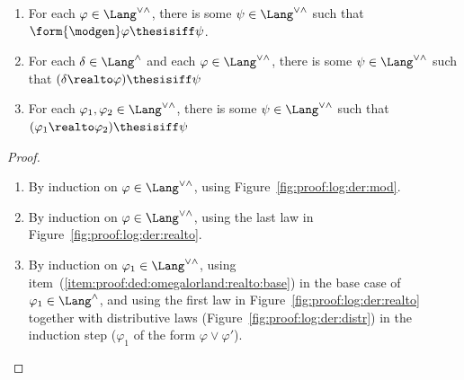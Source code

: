 \begin{lemma}
\label{lem:proof:ded:omegalorland:prelim}
\begin{enumerate}[(1)]
\item
\label{item:proof:ded:omegalorland:mod}
For each $\varphi \in \Lang^{\lor\land}$,
there is some $\psi \in \Lang^{\lor\land}$
such that $\form{\modgen}\varphi \thesisiff \psi$.

\item
\label{item:proof:ded:omegalorland:realto:base}
For each $\delta \in \Lang^{\land}$
and each $\varphi \in \Lang^{\lor\land}$,
there is some $\psi \in \Lang^{\lor\land}$
such that $(\delta \realto \varphi) \thesisiff \psi$

\item
\label{item:proof:ded:omegalorland:realto}
For each $\varphi_1, \varphi_2 \in \Lang^{\lor\land}$,
there is some $\psi \in \Lang^{\lor\land}$
such that $(\varphi_1 \realto \varphi_2) \thesisiff \psi$
\end{enumerate}
\end{lemma}

\begin{proof}
\begin{enumerate}[(1)]
\item 
By induction on $\varphi \in \Lang^{\lor\land}$,
using Figure~\ref{fig:proof:log:der:mod}.

\item
By induction on $\varphi \in \Lang^{\lor\land}$,
using the last law in Figure~\ref{fig:proof:log:der:realto}.

\item 
By induction on $\varphi_1 \in \Lang^{\lor\land}$,
using item~(\ref{item:proof:ded:omegalorland:realto:base})
in the base case of $\varphi_1 \in \Lang^\land$,
and using the first law in Figure~\ref{fig:proof:log:der:realto}
together with distributive laws
(Figure~\ref{fig:proof:log:der:distr})
in the induction step ($\varphi_1$ of the form $\varphi \lor \varphi'$).
\qedhere
\end{enumerate}
\end{proof}




